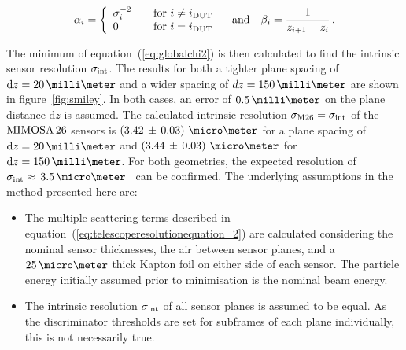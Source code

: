 \begin{equation}
\alpha_i = \left\{
  \begin{array}{l l}
    \sigma_{i}^{-2} & \quad \text{for $i \neq i_{\textrm{DUT}}$}\\
    0 & \quad \text{for $i = i_{\textrm{DUT}}$}
  \end{array} \right. \quad \text{and} \quad \beta_i = \frac{1}{z_{i + 1} - z_i} \,.
\end{equation}

The minimum of equation~(\ref{eq:globalchi2}) is then calculated to find the intrinsic sensor resolution $\sigma_{\textrm{int}}$.
The results for both a tighter plane spacing of $\dz = 20\,\milli\meter$ and a wider spacing of $dz = 150\,\milli\meter$ are shown in figure~\ref{fig:smiley}.
In both cases, an error of $0.5\,\milli\meter$ on the plane distance $\textrm{d}z$ is assumed.
The calculated intrinsic resolution $\sigma_{\textrm{M26}} = \sigma_{\textrm{int}}$ of the $\textrm{MIMOSA\,26}$ sensors is \allowbreak$\left( 3.42\,\pm\, \allowbreak 0.03 \right)\,\micro\meter$
 for a plane spacing of $\textrm{d}z =  20\,\milli\meter$ and $\left( 3.44\,\pm\, \allowbreak 0.03 \right)\,\micro\meter$ for $\textrm{d}z = 150\,\milli\meter$.
For both geometries, the expected resolution of $\sigmai \approx\,3.5\,\micro\meter$~\cite{ref:mimosa26} can be confirmed.
The underlying assumptions in the method presented here are:

\begin{itemize}

\item The multiple scattering terms described in equation~(\ref{eq:telescoperesolutionequation_2}) are calculated considering the nominal sensor thicknesses, the air between sensor planes, and a $25\,\micro\meter$
thick Kapton foil on either side of each sensor.
The particle energy initially assumed prior to minimisation is the nominal beam energy.

\item The intrinsic resolution $\sigma_{\textrm{int}}$ of all sensor planes is assumed to be equal.
As the discriminator thresholds are set for subframes of each plane individually, this is not necessarily true.

\end{itemize}


